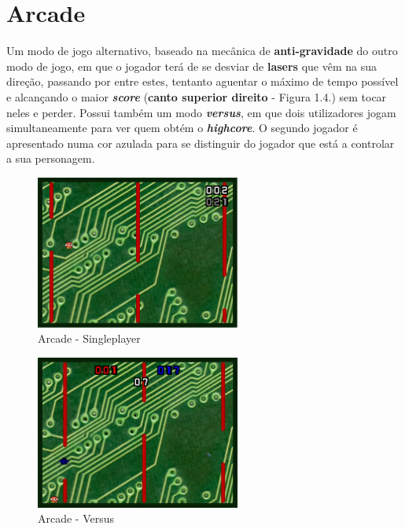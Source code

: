 \documentclass{report}
\begin{document}
\pagebreak

\section{Arcade}

Um modo de jogo alternativo, baseado na mecânica de \textbf{anti-gravidade} do outro modo de jogo, em que o jogador terá de se desviar de \textbf{lasers} que vêm na sua direção, passando por entre estes, tentanto aguentar o máximo de tempo possível e alcançando o maior \textbf{\textit{score}} (\textbf{canto superior direito} - Figura 1.4.) sem tocar neles e perder.
Possui também um modo \textbf{\textit{versus}}, em que dois utilizadores jogam simultaneamente para ver quem obtém o \textbf{\textit{highcore}}. O segundo jogador é apresentado numa cor azulada para se distinguir do jogador que está a controlar a sua personagem.

\begin{figure}[H]
	\centering
	\includegraphics[width=0.6\textwidth]{arcade}
	\caption{Arcade - Singleplayer}
\end{figure}

\begin{figure}[H]
	\centering
	\includegraphics[width=0.6\textwidth]{arcade_versus}
	\caption{Arcade - Versus}
\end{figure}
\end{document}
